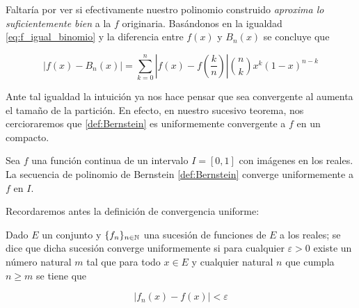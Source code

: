 Faltaría por ver si efectivamente nuestro polinomio construido
 \textit{aproxima lo suficientemente bien} a la $f$ originaria. 
Basándonos en la igualdad \eqref{eq:f_igual_binomio} y 
la diferencia entre $f(x)$ y $B_n(x)$ se concluye que


\begin{equation} \label{eq:berstein_diferencia}
    |f(x)-B_n(x)| = \sum_{k=0}^n \left|f(x) - f \left( \frac{k}{n} \right)\right|
    \binom{n}{k} x^{k} (1-x)^{n-k}
\end{equation} 

Ante tal igualdad la intuición ya nos
hace pensar que sea convergente al aumenta el tamaño de la partición.
 En efecto, en nuestro sucesivo teorema, nos cercioraremos que \ref{def:Bernstein}
 es uniformemente convergente a $f$ en un compacto. 

\begin{teorema}\label{teo:aproximacion_bernstein}

    Sea $f$ una función continua de un intervalo $I = [0,1]$ con imágenes en los reales. 
    La secuencia de polinomio de Bernstein
    \ref{def:Bernstein} converge uniformemente a $f$ en $I.$
    
\end{teorema}
Recordaremos antes la definición de convergencia uniforme: 

\begin{definicion}

    Dado $E$ un conjunto y $\{f_n\}_{n \in \mathbb{N}}$ una sucesión de funciones de $E$
     a los reales; se dice 
    que dicha sucesión converge uniformemente si para cualquier $\varepsilon > 0$ existe un número natural $m$ tal que 
    para todo $x   \in E$ y cualquier natural $n$ que cumpla $n \geq m$ se tiene que 

    \begin{equation*}
        |f_n(x) - f(x) | < \varepsilon
    \end{equation*}
    
\end{definicion}

